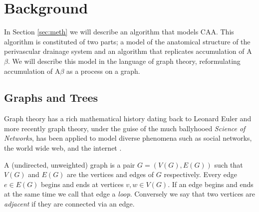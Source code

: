 \documentclass[12pt]{article} %
\theoremstyle{definition}
\begin{document}
\section{Background}

In Section \ref{sec:meth} we will describe an algorithm that models CAA.  This algorithm is constituted of two parts; a model of the anatomical structure of the perivascular drainage system and an algorithm that replicates accumulation of A$\beta$.  We will describe this model in the language of graph theory, reformulating accumulation of A$\beta$ as a process on a graph.      

\subsection{Graphs and Trees}
Graph theory has a rich mathematical history dating back to Leonard Euler and more recently graph theory, under the guise of the much ballyhooed \emph{Science of Networks}, has been applied to model diverse phenomena such as social networks, the world wide web, and the internet \cite{barabasi,bigg}.

A (undirected, unweighted) graph is a pair $G = (V(G),E(G))$ such that $V(G)$ and $E(G)$ are the vertices and edges of $G$ respectively. Every edge $e \in E(G)$ begins and ends at vertices $ v,w \in V(G)$. If an edge begins and ends at the same time we call that edge a \emph{loop}.  Conversely we say that two vertices are \emph{adjacent} if they are connected via an edge.
\end{document}
